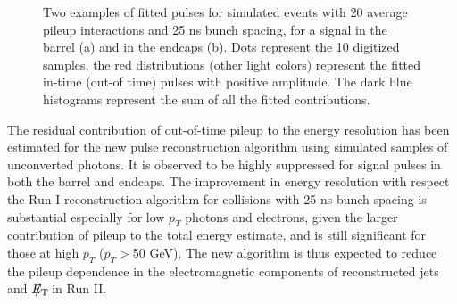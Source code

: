 \documentclass[journal]{IEEEtran}
\newcommand{\ETslash}{\ensuremath{E_{\mathrm{T}}\hspace{-1.1em}/\kern0.45em}}
\begin{document}
\begin{figure}[!t]
\begin{center}
    \caption{Two examples of fitted pulses for simulated events with 20 average pileup interactions and 25 ns bunch spacing, for a signal in the barrel (a) and in the endcaps (b). Dots represent the 10 digitized samples, the red distributions (other light colors) represent the fitted in-time (out-of time) pulses with positive amplitude. The dark blue histograms represent the sum of all the fitted contributions.  \label{fig:multifits} }
  \end{center}
\end{figure}

The residual contribution of out-of-time pileup to the energy resolution has been estimated for the new pulse reconstruction algorithm using simulated samples of unconverted photons. It is observed to be highly suppressed for signal pulses in both the barrel and endcaps. The improvement in energy resolution  with respect the Run I reconstruction algorithm for collisions with 25 ns bunch spacing is substantial especially for low $p_T$ photons and electrons, given the larger contribution of pileup to the total energy estimate, and is still significant for those at high $p_T$ ($p_T>$50 GeV). The new algorithm is thus expected to reduce the pileup dependence in the electromagnetic components of reconstructed jets and $\ETslash$ in Run II.
\end{document}
